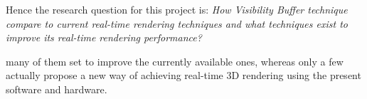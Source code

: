 Hence the research question for this project is:
\setlenght{\parindent}{3em}
\emph{How Visibility Buffer technique compare to current real-time
rendering techniques and what techniques exist to improve its real-time
rendering performance?}



many of them set to improve the currently
available ones, whereas only a few actually propose a new way of achieving
real-time 3D rendering using the present software and hardware.



